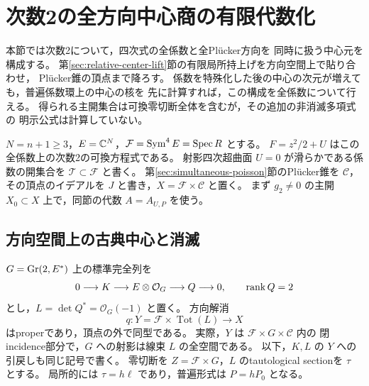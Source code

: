 \section{次数2の全方向中心商の有限代数化}
\label{sec:simultaneous-degree-two-center}

本節では次数2について，四次式の全係数と全Pl\"ucker方向を
同時に扱う中心元を構成する。
第\ref{sec:relative-center-lift}節の有限局所持上げを方向空間上で貼り合わせ，
Pl\"ucker錐の頂点まで降ろす。
係数を特殊化した後の中心の次元が増えても，普遍係数環上の中心の核を
先に計算すれば，この構成を全係数について行える。
得られる主開集合は可換零切断全体を含むが，その追加の非消滅多項式の
明示公式は計算していない。

$N=n+1\ge3$，$E=\mathbb C^N$，$\mathcal F=\operatorname{Sym}^4E=\operatorname{Spec} R$ とする。
$F=z^2/2+U$ はこの全係数上の次数2の可換方程式である。
射影四次超曲面 $U=0$ が滑らかである係数の開集合を
$\mathcal T\subset\mathcal F$ と書く。
第\ref{sec:simultaneous-poisson}節のPl\"ucker錐を $\mathcal C$，
その頂点のイデアルを $J$ と書き，$X=\mathcal F\times\mathcal C$ と置く。
まず $g_2\ne0$ の主開 $X_0\subset X$ 上で，同節の代数 $A=A_{U,P}$ を使う。

\subsection{方向空間上の古典中心と消滅}

$G=\operatorname{Gr}(2,E^*)$ 上の標準完全列を
\[
 0\longrightarrow K\longrightarrow E\otimes\mathcal O_G
        \longrightarrow Q\longrightarrow0,
 \qquad \operatorname{rank} Q=2
\]
とし，$L=\det Q^*=\mathcal O_G(-1)$ と置く。
方向解消
\[
 q:Y=\mathcal F\times\operatorname{Tot}(L)\longrightarrow X
\]
はproperであり，頂点の外で同型である。
実際，$Y$ は $\mathcal F\times G\times\mathcal C$ 内の
閉incidence部分で，$G$ への射影は線束 $L$ の全空間である。
以下，$K,L$ の $Y$ への引戻しも同じ記号で書く。
零切断を $Z=\mathcal F\times G$，$L$ のtautological sectionを $\tau$ とする。
局所的には $\tau=h\ell$ であり，普遍形式は $P=hP_0$ となる。

